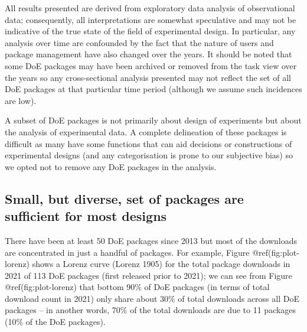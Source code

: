 \documentclass{article}
\begin{document}
All results presented are derived from exploratory data analysis of
observational data; consequently, all interpretations are somewhat
speculative and may not be indicative of the true state of the field of
experimental design. In particular, any analysis over time are
confounded by the fact that the nature of users and package management
have also changed over the years. It should be noted that some DoE
packages may have been archived or removed from the task view over the
years so any cross-sectional analysis presented may not reflect the set
of all DoE packages at that particular time period (although we assume
such incidences are low).

A subset of DoE packages is not primarily about design of experiments
but about the analysis of experimental data. A complete delineation of
these packages is difficult as many have some functions that can aid
decisions or constructions of experimental designs (and any
categorisation is prone to our subjective bias) so we opted not to
remove any DoE packages in the analysis.

\hypertarget{popular}{%
\subsection{Small, but diverse, set of packages are sufficient for most
designs}\label{popular}}

There have been at least 50 DoE packages since 2013 but most of the
downloads are concentrated in just a handful of packages. For example,
Figure @ref(fig:plot-lorenz) shows a Lorenz curve (Lorenz 1905) for the
total package downloads in 2021 of 113 DoE packages (first released
prior to 2021); we can see from Figure @ref(fig:plot-lorenz) that bottom
90\% of DoE packages (in terms of total download count in 2021) only
share about 30\% of total downloads across all DoE packages -- in
another words, 70\% of the total downloads are due to 11 packages (10\%
of the DoE packages).
\end{document}
